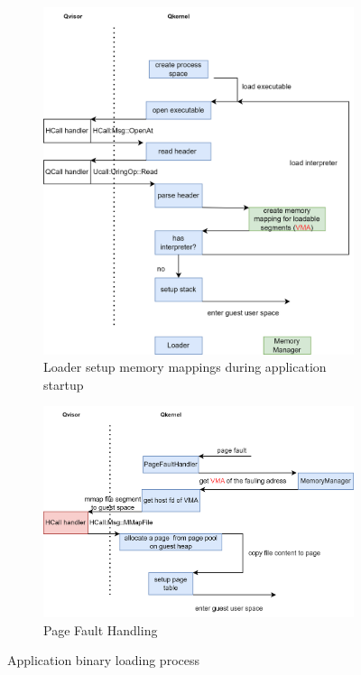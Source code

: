 \begin{figure}[ht] 
  \begin{subfigure}[b]{0.5\linewidth}
    \centering
    \includegraphics[width=0.9\linewidth]{images/loader_flow.png} 
    \caption{Loader setup memory mappings during application startup} 
    \label{fig2:a} 
    \vspace{4ex}
  \end{subfigure}%
  \begin{subfigure}[b]{0.5\linewidth}
    \centering
    \includegraphics[width=0.9\linewidth]{images/page_fault_handling.png} 
    \caption{Page Fault Handling} 
    \label{fig2:b} 
    \vspace{4ex}
  \end{subfigure} 
  \caption{Application binary loading process}
  \label{fig2} 
\end{figure}

